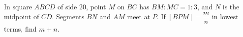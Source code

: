In square $ABCD$ of side $20$, point $M$ on $BC$ has $BM:MC=1:3$, and $N$ is the midpoint of $CD$. Segments $BN$ and $AM$ meet at $P$. If $[BPM]=\dfrac{m}{n}$ in lowest terms, find $m+n$.
